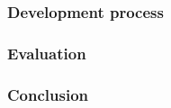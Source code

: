 \documentclass[10pt,xetex]{beamer} %
\begin{document}
\begin{frame}
  \frametitle{Development process}

\end{frame}

\begin{frame}
  \frametitle{Evaluation}
\end{frame}

\begin{frame}

\end{frame}

\begin{frame}
  \frametitle{Conclusion}
\end{frame}
\end{document}
